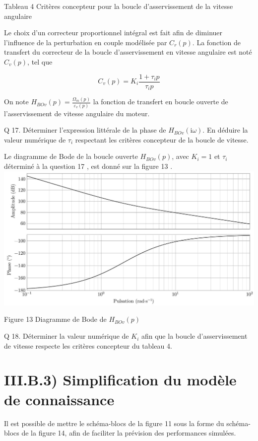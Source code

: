 \documentclass[10pt]{article}
\begin{document}
Tableau 4 Critères concepteur pour la boucle d'asservissement de la vitesse angulaire

Le choix d'un correcteur proportionnel intégral est fait afin de diminuer l'influence de la perturbation en couple modélisée par $C_{r}(p)$. La fonction de transfert du correcteur de la boucle d'asservissement en vitesse angulaire est noté $C_{v}(p)$, tel que

$$
C_{v}(p)=K_{i} \frac{1+\tau_{i} p}{\tau_{i} p}
$$

On note $H_{B O v}(p)=\frac{\Omega_{m}(p)}{\varepsilon_{v}(p)}$ la fonction de transfert en boucle ouverte de l'asservissement de vitesse angulaire du moteur.

Q 17. Déterminer l'expression littérale de la phase de $H_{B O v}(\mathrm{i} \omega)$. En déduire la valeur numérique de $\tau_{i}$ respectant les critères concepteur de la boucle de vitesse.

Le diagramme de Bode de la boucle ouverte $H_{B O v}(p)$, avec $K_{i}=1$ et $\tau_{i}$ déterminé à la question 17 , est donné sur la figure 13 .\\
\includegraphics[max width=\textwidth, center]{2024_03_20_0c3cf888f6e04b1986bcg-10(1)}

Figure 13 Diagramme de Bode de $H_{B O v}(p)$

Q 18. Déterminer la valeur numérique de $K_{i}$ afin que la boucle d'asservissement de vitesse respecte les critères concepteur du tableau 4.

\section*{III.B.3) Simplification du modèle de connaissance}
Il est possible de mettre le schéma-blocs de la figure 11 sous la forme du schéma-blocs de la figure 14, afin de faciliter la prévision des performances simulées.
\end{document}
